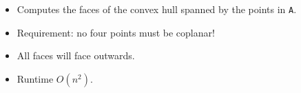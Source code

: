\begin{itemize}
	\item Computes the faces of the convex hull spanned by the points in \lstinline{A}.
	\item Requirement: no four points must be coplanar!
	\item All faces will face outwards.
	\item Runtime $O\left(n^2\right)$.
\end{itemize}
